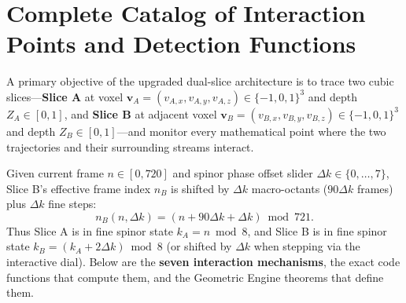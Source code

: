 \documentclass[11pt, a4paper]{article}
\begin{document}
\section{Complete Catalog of Interaction Points and Detection Functions}

A primary objective of the upgraded dual-slice architecture is to trace two cubic slices---\textbf{Slice A} at voxel $\mathbf{v}_A = (v_{A,x}, v_{A,y}, v_{A,z}) \in \{-1,0,1\}^3$ and depth $Z_A \in [0,1]$, and \textbf{Slice B} at adjacent voxel $\mathbf{v}_B = (v_{B,x}, v_{B,y}, v_{B,z}) \in \{-1,0,1\}^3$ and depth $Z_B \in [0,1]$---and monitor every mathematical point where the two trajectories and their surrounding streams interact.

Given current frame $n \in [0, 720]$ and spinor phase offset slider $\Delta k \in \{0, \dots, 7\}$, Slice B's effective frame index $n_B$ is shifted by $\Delta k$ macro-octants ($90\Delta k$ frames) plus $\Delta k$ fine steps:
\begin{equation}
n_B(n, \Delta k) = (n + 90\Delta k + \Delta k) \bmod 721.
\label{eq:step-b}
\end{equation}
Thus Slice A is in fine spinor state $k_A = n \bmod 8$, and Slice B is in fine spinor state $k_B = (k_A + 2\Delta k) \bmod 8$ (or shifted by $\Delta k$ when stepping via the interactive dial). Below are the \textbf{seven interaction mechanisms}, the exact code functions that compute them, and the Geometric Engine theorems that define them.
\end{document}
